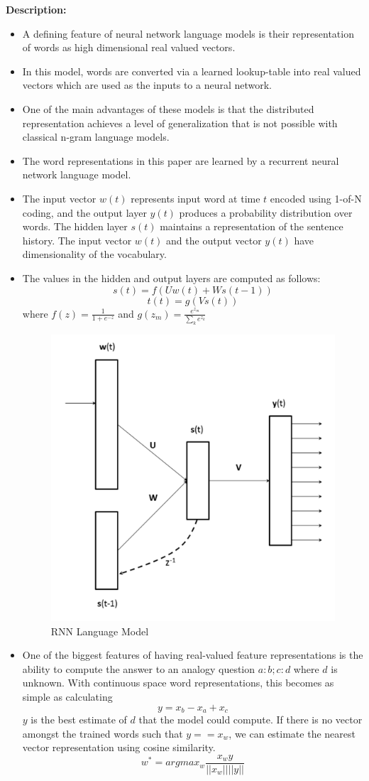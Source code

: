\documentclass[11pt,a4paper]{article}
\begin{document}
  \textbf{Description:}
  \begin{itemize}
    \item
    A defining feature of neural network language models is their representation of words as high dimensional real valued vectors.
    \item
    In this model, words are converted via a learned lookup-table into real valued vectors which are used as the inputs to a neural network.
    \item
    One of the main advantages of these models is that the distributed representation achieves a level of generalization that is not possible with classical n-gram language models.
    \item
    The word representations in this paper are learned by a recurrent neural network language model.
    \item
    The input vector $w(t)$ represents input word at time $t$ encoded using 1-of-N coding, and the output layer $y(t)$ produces a probability distribution over words. The hidden layer $s(t)$ maintains a representation of the sentence history. The input vector $w(t)$ and the output vector $y(t)$ have dimensionality of the vocabulary.
    \item
    The values in the hidden and output layers are computed as follows:
    $$s(t) = f(Uw(t) + Ws(t-1))$$
    $$t(t) = g(Vs(t))$$
    where
    $f(z) = \frac{1}{1 + e^{-z}}$ and $g(z_m) = \frac{e^{z_m}}{\sum_k e^{z_k}} $
    \begin{figure}[ht]
      \centering
      \includegraphics[width=.4\textwidth]{rnn-lang-model}
      \caption{RNN Language Model}
      \label{fig:rnn-lang-model}
    \end{figure}
    \item
    One of the biggest features of having real-valued feature representations is the ability to compute the answer to an analogy question $a:b; c:d$ where $d$ is unknown. With continuous space word representations, this becomes as simple as calculating
    $$y = x_b - x_a + x_c$$
    $y$ is the best estimate of $d$ that the model could compute. If there is no vector amongst the trained words such that $y == x_w$, we can estimate the nearest vector representation using cosine similarity.
    $$w^* = argmax_w \frac{x_w y}{||x_w|| ||y||}$$
  \end{itemize}
\end{document}
